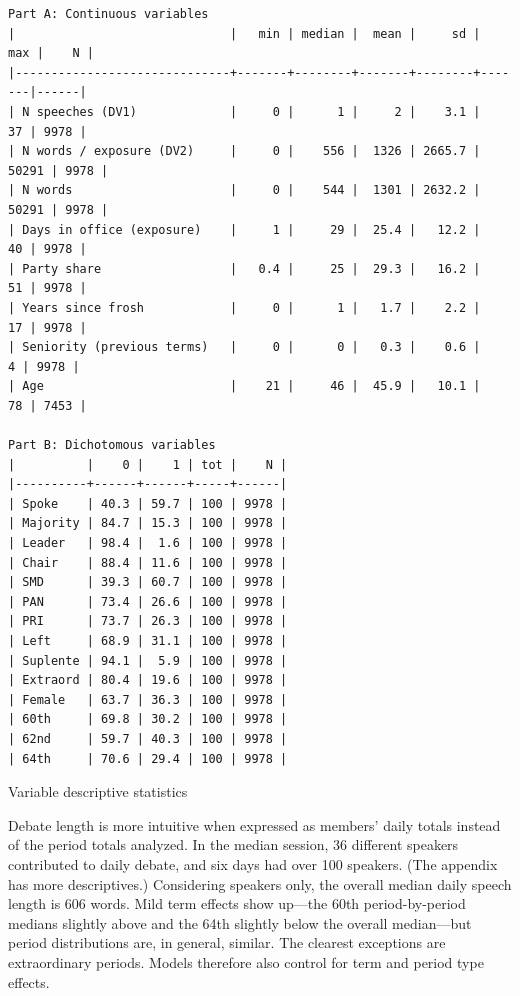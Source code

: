\documentclass[letter,12pt]{article}
\begin{document}
\begin{table}
  \begin{scriptsize}
    \begin{verbatim}
Part A: Continuous variables
|                              |   min | median |  mean |     sd |   max |    N |
|------------------------------+-------+--------+-------+--------+-------|------|
| N speeches (DV1)             |     0 |      1 |     2 |    3.1 |    37 | 9978 |
| N words / exposure (DV2)     |     0 |    556 |  1326 | 2665.7 | 50291 | 9978 |
| N words                      |     0 |    544 |  1301 | 2632.2 | 50291 | 9978 |
| Days in office (exposure)    |     1 |     29 |  25.4 |   12.2 |    40 | 9978 |
| Party share                  |   0.4 |     25 |  29.3 |   16.2 |    51 | 9978 |
| Years since frosh            |     0 |      1 |   1.7 |    2.2 |    17 | 9978 |
| Seniority (previous terms)   |     0 |      0 |   0.3 |    0.6 |     4 | 9978 |
| Age                          |    21 |     46 |  45.9 |   10.1 |    78 | 7453 |

Part B: Dichotomous variables
|          |    0 |    1 | tot |    N |
|----------+------+------+-----+------|
| Spoke    | 40.3 | 59.7 | 100 | 9978 |
| Majority | 84.7 | 15.3 | 100 | 9978 |
| Leader   | 98.4 |  1.6 | 100 | 9978 |
| Chair    | 88.4 | 11.6 | 100 | 9978 |
| SMD      | 39.3 | 60.7 | 100 | 9978 |
| PAN      | 73.4 | 26.6 | 100 | 9978 |
| PRI      | 73.7 | 26.3 | 100 | 9978 |
| Left     | 68.9 | 31.1 | 100 | 9978 |
| Suplente | 94.1 |  5.9 | 100 | 9978 |
| Extraord | 80.4 | 19.6 | 100 | 9978 |
| Female   | 63.7 | 36.3 | 100 | 9978 |
| 60th     | 69.8 | 30.2 | 100 | 9978 |
| 62nd     | 59.7 | 40.3 | 100 | 9978 |
| 64th     | 70.6 | 29.4 | 100 | 9978 |
    \end{verbatim}
  \end{scriptsize}
\caption{Variable descriptive statistics}\label{T:descriptives}
\end{table}

Debate length is more intuitive when expressed as members' daily totals instead of the period totals analyzed. In the median session, 36 different speakers contributed to daily debate, and six days had over 100 speakers. (The appendix has more descriptives.) Considering speakers only, the overall median daily speech length is 606 words. Mild term effects show up---the 60th period-by-period medians slightly above and the 64th slightly below the overall median---but period distributions are, in general, similar. The clearest exceptions are extraordinary periods. Models therefore also control for term and period type effects.
\end{document}
